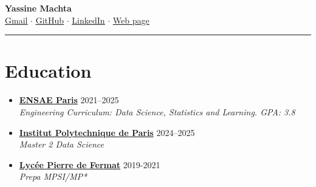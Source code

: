 \documentclass[letterpaper,11pt,twocolumn]{article}
\newcommand{\resumeSubheading}[4]{
	\vspace{-2pt}\item \textbf{#1} \hfill #2 \\
	\textit{\small #3} \hfill \textit{\small #4} 
	\vspace{-7pt}
}
\begin{document}
	
	\begin{center}
		{\LARGE \textbf{Yassine Machta}} \\[5pt]
		\href{mailto:machtayassine@gmail.com}{ \underline{Gmail}} $\cdot$ 
		\href{https://github.com/MachtaYassine}{ \underline{GitHub}} $\cdot$ 
		\href{https://www.linkedin.com/in/yassine-machta-a00307206/}{ \underline{LinkedIn}} $\cdot$ 
		\href{https://machtayassine.github.io}{ \underline{Web page}}
	\end{center}
	
	\vspace{-10pt}
	\hrule
	\vspace{-15pt}
	
	\section{Education}
	\begin{itemize}[leftmargin=*]
		\resumeSubheading
		{\href{https://www.ensae.fr/en}{ENSAE Paris}}{2021--2025}
		{Engineering Curriculum: Data Science, Statistics and Learning. GPA: 3.8}{}
		\resumeSubheading
		{\href{https://www.ip-paris.fr/}{Institut Polytechnique de Paris}}{2024--2025}
		{Master 2 Data Science}{}
        \resumeSubheading
		{\href{https://fermat.mon-ent-occitanie.fr/}{Lycée Pierre de Fermat}}{2019-2021}
		{Prepa MPSI/MP*}{}
	\end{itemize}
	
\end{document}
